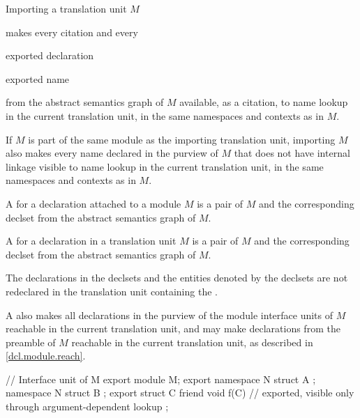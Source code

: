 \begin{std.txt}
  \alinea
  \begin{after}
  Importing a translation unit $M$
  \end{after}
  makes every citation and every
  \begin{before}\color{addclr}
  exported declaration
  \end{before}
  \begin{after}\color{addclr}
  exported name
  \end{after}
  from the 
  abstract semantics graph of $M$ available, as a citation,
  to name lookup in
  the current translation unit, in the same namespaces and contexts
  as in $M$.
  \begin{after}
  If $M$ is part of the same module as the importing translation unit,
  importing $M$ also makes every name declared in the purview of $M$
  that does not have internal linkage visible to name lookup
  in the current translation unit, in the same namespaces and contexts
  as in $M$.
  \end{after}
  \begin{before}\color{addclr}
  A  for a declaration attached to a module $M$ is a pair of
  $M$ and the corresponding declset from the abstract semantics graph 
  of $M$. 
  \end{before}
  \begin{after}\color{addclr}
  A  for a declaration in a translation unit $M$ is a pair of
  $M$ and the corresponding declset from the abstract semantics graph 
  of $M$. 
  \end{after}
  \enternote
  The declarations in the declsets and the entities denoted by the declsets
  are not redeclared in the translation unit
  containing the .
  \exitnote

  \begin{after}\color{addclr}
  \alinea
  \enternote
  A  also makes all
  declarations in the purview of the module interface units of $M$
  reachable in the current translation unit, and may make declarations
  from the preamble of $M$ reachable in the current translation
  unit, as described in \ref{dcl.module.reach}.
  \exitnote
  \end{after}
  \begin{example}
  \begin{Program}
     // Interface unit of M
     export module M;
     export namespace N {
        struct A { };
     }
     namespace N {
        struct B { };
        export struct C {
           friend void f(C) { }  // exported, visible only through argument-dependent lookup
        };
     }


\end{Program}
\end{example}
\end{std.txt}

